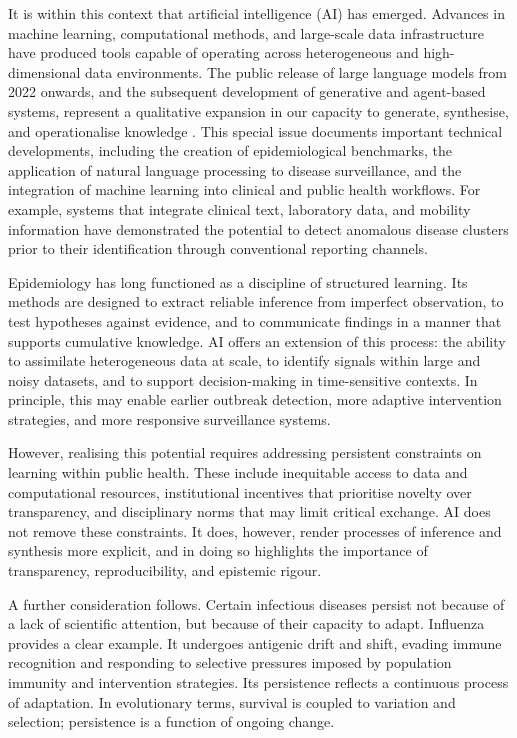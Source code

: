 \documentclass[12pt]{article}
\begin{document}
It is within this context that artificial intelligence (AI) has emerged. Advances in machine learning, computational methods, and large-scale data infrastructure have produced tools capable of operating across heterogeneous and high-dimensional data environments. The public release of large language models from 2022 onwards, and the subsequent development of generative and agent-based systems, represent a qualitative expansion in our capacity to generate, synthesise, and operationalise knowledge \cite{openai2023}. This special issue documents important technical developments, including the creation of epidemiological benchmarks, the application of natural language processing to disease surveillance, and the integration of machine learning into clinical and public health workflows. For example, systems that integrate clinical text, laboratory data, and mobility information have demonstrated the potential to detect anomalous disease clusters prior to their identification through conventional reporting channels. 

Epidemiology has long functioned as a discipline of structured learning. Its methods are designed to extract reliable inference from imperfect observation, to test hypotheses against evidence, and to communicate findings in a manner that supports cumulative knowledge. AI offers an extension of this process: the ability to assimilate heterogeneous data at scale, to identify signals within large and noisy datasets, and to support decision-making in time-sensitive contexts. In principle, this may enable earlier outbreak detection, more adaptive intervention strategies, and more responsive surveillance systems.

However, realising this potential requires addressing persistent constraints on learning within public health. These include inequitable access to data and computational resources, institutional incentives that prioritise novelty over transparency, and disciplinary norms that may limit critical exchange. AI does not remove these constraints. It does, however, render processes of inference and synthesis more explicit, and in doing so highlights the importance of transparency, reproducibility, and epistemic rigour.

A further consideration follows. Certain infectious diseases persist not because of a lack of scientific attention, but because of their capacity to adapt. Influenza provides a clear example. It undergoes antigenic drift and shift, evading immune recognition and responding to selective pressures imposed by population immunity and intervention strategies. Its persistence reflects a continuous process of adaptation. In evolutionary terms, survival is coupled to variation and selection; persistence is a function of ongoing change.
\end{document}
